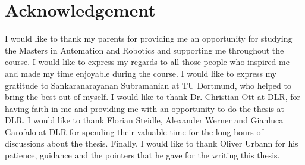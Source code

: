 \section*{Acknowledgement}
I would like to thank my parents for providing me an opportunity for studying the Masters in Automation and Robotics and supporting me throughout the course. I would like to express my regards to all those people who inspired me and made my time enjoyable during the course. I would like to express my gratitude to Sankaranarayanan Subramanian at TU Dortmund, who helped to bring the best out of myself. I would like to thank Dr. Christian Ott at DLR, for having faith in me and providing me with an opportunity to do the thesis at DLR. I would like to thank Florian Steidle, Alexander Werner and Gianluca Garofalo at DLR for spending their valuable time for the long hours of discussions about the thesis. Finally, I would like to thank Oliver Urbann for his patience, guidance and the pointers that he gave for the writing this thesis.